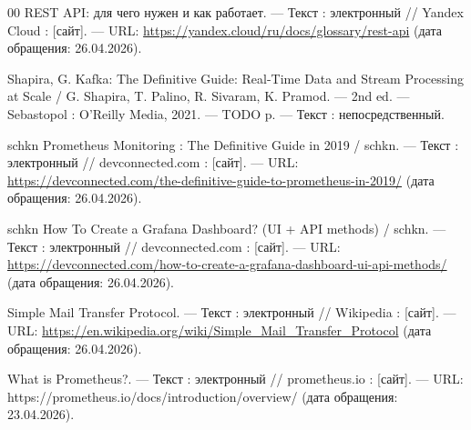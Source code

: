 \begin{thebibliography}{00}
    REST API: для чего нужен и как работает. — Текст : электронный // Yandex Cloud : [сайт]. — URL: \url{https://yandex.cloud/ru/docs/glossary/rest-api} (дата обращения: 26.04.2026).

    Shapira, G. Kafka: The Definitive Guide: Real-Time Data and Stream Processing at Scale / G. Shapira, T. Palino, R. Sivaram, K. Pramod. — 2nd ed. — Sebastopol : O'Reilly Media, 2021. — TODO p. — Текст : непосредственный.

    \hypertarget{prometheus_guide}{}
    schkn Prometheus Monitoring : The Definitive Guide in 2019 / schkn. — Текст : электронный // devconnected.com : [сайт]. — URL: \url{https://devconnected.com/the-definitive-guide-to-prometheus-in-2019/} (дата обращения: 26.04.2026).

    \hypertarget{grafana_guide}{}
    schkn How To Create a Grafana Dashboard? (UI + API methods) / schkn. — Текст : электронный // devconnected.com : [сайт]. — URL: \url{https://devconnected.com/how-to-create-a-grafana-dashboard-ui-api-methods/} (дата обращения: 26.04.2026).

    Simple Mail Transfer Protocol. — Текст : электронный // Wikipedia : [сайт]. — URL: \url{https://en.wikipedia.org/wiki/Simple_Mail_Transfer_Protocol} (дата обращения: 26.04.2026).

    \hypertarget{prometheus_official}{}
    What is Prometheus?. — Текст : электронный // prometheus.io : [сайт]. — URL: https://prometheus.io/docs/introduction/overview/ (дата обращения: 23.04.2026).

\end{thebibliography}
